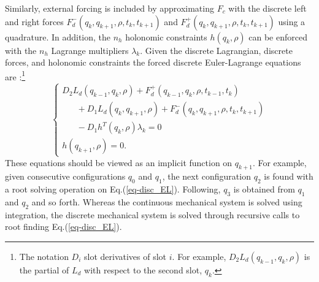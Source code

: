 \documentclass[letterpaper, 10pt, conference]{ieeeconf}
\begin{document}
Similarly, external forcing is included by approximating $F_c$ with the discrete left and right forces $F_d^-(q_k,q_{k+1},\rho,t_k,t_{k+1})$ and $F_d^+(q_k,q_{k+1},\rho,t_k,t_{k+1})$ using a quadrature.  In addition, the $n_h$ holonomic constraints $h(q_k,\rho)$ can be enforced with the $n_h$ Lagrange multipliers $\lambda_k$.  Given the discrete Lagrangian, discrete forces, and holonomic constraints the forced discrete Euler-Lagrange equations are \cite{johnson_murphey_scalable}:\footnote{The notation $D_i$ slot derivatives of slot $i$.  For example, $D_2 L_d(q_{k-1},q_{k},\rho)$ is the partial of $L_d$ with respect to the second slot, $q_{k}$.}
\begin{equation}
\left\{\begin{array}{l}
D_2 L_d(q_{k-1},q_{k},\rho) + F_d^+(q_{k-1},q_{k},\rho,t_{k-1},t_{k}) \\\hspace{20pt}+ D_1L_d(q_k,q_{k+1},\rho) + F_d^-(q_k,q_{k+1},\rho,t_k,t_{k+1}) \\\hspace{20pt} - D_1h^T(q_k,\rho)\lambda_k= 0 \\
\hspace{0pt}h(q_{k+1},\rho) = 0.
\end{array}
\right.
\label{eq-disc_EL}
\end{equation}
These equations should be viewed as an implicit function on $q_{k+1}$.  For example, given consecutive configurations $q_0$ and $q_1$, the next configuration $q_2$ is found with a root solving operation on Eq.(\ref{eq-disc_EL}). Following, $q_3$ is obtained from $q_1$ and $q_2$ and so forth.  Whereas the continuous mechanical system is solved using integration, the discrete mechanical system is solved through recursive calls to root finding Eq.(\ref{eq-disc_EL}). 
\end{document}
